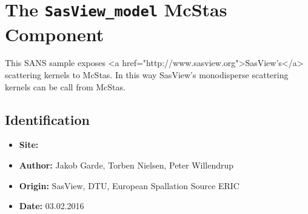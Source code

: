 \section{The \texttt{SasView\_model} McStas Component}
This SANS sample exposes \textless{}a href="http://www.sasview.org"\textgreater{}SasView's\textless{}/a\textgreater{} scattering kernels to McStas. In this way SasView's monodisperse scattering kernels can be call from McStas.

\subsection*{Identification}
\begin{itemize}
  \item \textbf{Site:} 
  \item \textbf{Author:} Jakob Garde, Torben Nielsen, Peter Willendrup
  \item \textbf{Origin:} SasView, DTU, European Spallation Source ERIC
  \item \textbf{Date:} 03.02.2016
\end{itemize}

